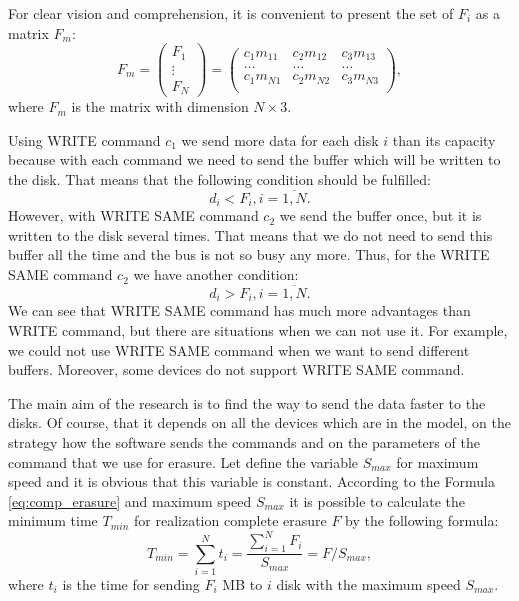 For clear vision and comprehension, it is convenient to present the set of $F_i$ as a matrix $F_m$:
\begin{equation}
	F_m =
	\begin{pmatrix}
		F_1\\ \vdots\\ F_N 
	\end{pmatrix}
	=
	\begin{pmatrix}
		c_1 m_{11} & c_2 m_{12} & c_3 m_{13} \\
		\ldots & \ldots & \ldots \\
		c_1 m_{N1} & c_2 m_{N2} & c_3 m_{N3} \\
	\end{pmatrix},
\end{equation}
where $F_m$ is the matrix with dimension $N\times3$.

Using WRITE command $c_1$ we send more data for each disk $i$ than its capacity because with each command we need to send the buffer which will be written to the disk. That means that the following condition should be fulfilled:
\begin{equation}
	d_i < F_i, i=\overline{1,N}.
\end{equation}
However, with WRITE SAME command $c_2$ we send the buffer once, but it is written to the disk several times. That means that we do not need to send this buffer all the time and the bus is not so busy any more. Thus, for the WRITE SAME command $c_2$ we have another condition:
\begin{equation}
	d_i > F_i, i=\overline{1,N}.
\end{equation}
We can see that WRITE SAME command has much more advantages than WRITE command, but there are situations when we can not use it. For example, we could not use WRITE SAME command when we want to send different buffers. Moreover, some devices do not support WRITE SAME command.

The main aim of the research is to find the way to send the data faster to the disks. Of course, that it depends on all the devices which are in the model, on the strategy how the software sends the commands and on the parameters of the command that we use for erasure. Let define the variable $S_{max}$ for maximum speed and it is obvious that this variable is constant. According to the Formula \ref{eq:comp_erasure} and maximum speed $S_{max}$ it is possible to calculate the minimum time $T_{min}$ for realization complete erasure $F$ by the following formula:
\begin{equation}
\label{eq:time_min}
	T_{min} = \sum_{i=1}^{N}t_i 
			= \frac{\sum_{i=1}^{N}F_i}{S_{max}}
			= F/S_{max},
\end{equation}
where $t_i$ is the time for sending $F_i$ MB to $i$ disk with the maximum speed $S_{max}$. 




